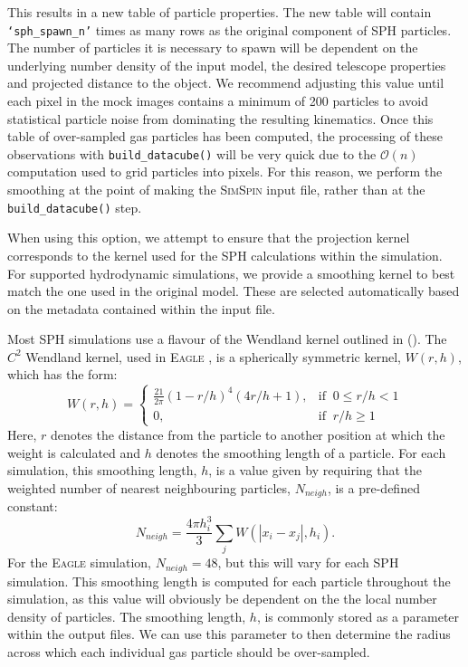 \documentclass[
  journal=pasa,
  manuscript=research-paper, %
  year=2020,
  volume=37,
]{cup-journal}
\newcommand{\simspin}[1]{\textsc{SimSpin}#1} %
\newcommand{\eagle}[1]{\textsc{Eagle}#1} %
\newcommand{\citetoggle}[1]{\citeauthor{#1} (\citeyear{#1})}
\newcommand{\builddatacube}[1]{\texttt{build\_datacube()}#1}
\begin{document}
This results in a new table of particle properties. 
The new table will contain \texttt{`sph\_spawn\_n'} times as many rows as the original component of SPH particles. 
The number of particles it is necessary to spawn will be dependent on the underlying number density of the input model, the desired telescope properties and projected distance to the object. We recommend adjusting this value until each pixel in the mock images contains a minimum of 200 particles to avoid statistical particle noise from dominating the resulting kinematics.
Once this table of over-sampled gas particles has been computed, the processing of these observations with \builddatacube{} will be very quick due to the $\mathcal{O}(n)$ computation used to grid particles into pixels. 
For this reason, we perform the smoothing at the point of making the \simspin{} input file, rather than at the \builddatacube{} step. 

When using this option, we attempt to ensure that the projection kernel corresponds to the kernel used for the SPH calculations within the simulation. 
For supported hydrodynamic simulations, we provide a smoothing kernel to best match the one used in the original model.
These are selected automatically based on the metadata contained within the input file. 

Most SPH simulations use a flavour of the Wendland kernel outlined in \citetoggle{Wendland1995PiecewiseDegree}. 
The $C^{2}$ Wendland kernel, used in \eagle{} \citep{Schaller2015TheScheme}, is a spherically symmetric kernel, $W(r,h)$, which has the form: 
\begin{equation}
    W(r,h) =
    \begin{cases}
        \frac{21}{2 \pi}(1 - r/h)^4 (4r/h + 1),& \text{if }\ 0 \leq r/h < 1\\
        0,                                     & \text{if }\ r/h \geq 1
    \end{cases}
\end{equation}
Here, $r$ denotes the distance from the particle to another position at which the weight is calculated and $h$ denotes the smoothing length of a particle. 
For each simulation, this smoothing length, $h$, is a value given by requiring that the weighted number of nearest neighbouring particles, $N_{neigh}$, is a pre-defined constant:
\begin{equation}
    N_{neigh} = \frac{4 \pi h_i^3}{3} \sum_j W\left(|x_i - x_j|, h_i \right).
\end{equation}
For the \eagle{} simulation, $N_{neigh} = 48$, but this will vary for each SPH simulation.
This smoothing length is computed for each particle throughout the simulation, as this value will obviously be dependent on the the local number density of particles.
The smoothing length, $h$, is commonly stored as a parameter within the output files. 
We can use this parameter to then determine the radius across which each individual gas particle should be over-sampled.   
\end{document}
